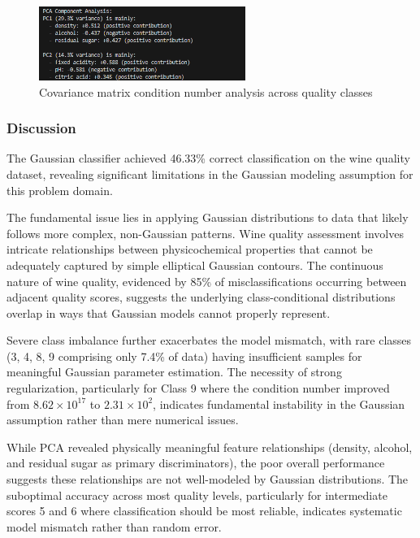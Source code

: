 \documentclass[12pt]{article}
\begin{document}
\begin{figure}[H]
    \centering
    \includegraphics[width=0.6\textwidth]{wine_covariance_analysis.png}
    \caption{Covariance matrix condition number analysis across quality classes}
    \label{fig:wine_covariance_analysis}
\end{figure}

\subsubsection{Discussion}
The Gaussian classifier achieved 46.33\% correct classification on the wine quality dataset, revealing significant limitations in the Gaussian modeling assumption for this problem domain.

The fundamental issue lies in applying Gaussian distributions to data that likely follows more complex, non-Gaussian patterns. Wine quality assessment involves intricate relationships between physicochemical properties that cannot be adequately captured by simple elliptical Gaussian contours. The continuous nature of wine quality, evidenced by 85\% of misclassifications occurring between adjacent quality scores, suggests the underlying class-conditional distributions overlap in ways that Gaussian models cannot properly represent.

Severe class imbalance further exacerbates the model mismatch, with rare classes (3, 4, 8, 9 comprising only 7.4\% of data) having insufficient samples for meaningful Gaussian parameter estimation. The necessity of strong regularization, particularly for Class 9 where the condition number improved from $8.62\times10^{17}$ to $2.31\times10^{2}$, indicates fundamental instability in the Gaussian assumption rather than mere numerical issues.

While PCA revealed physically meaningful feature relationships (density, alcohol, and residual sugar as primary discriminators), the poor overall performance suggests these relationships are not well-modeled by Gaussian distributions. The suboptimal accuracy across most quality levels, particularly for intermediate scores 5 and 6 where classification should be most reliable, indicates systematic model mismatch rather than random error.
\end{document}
